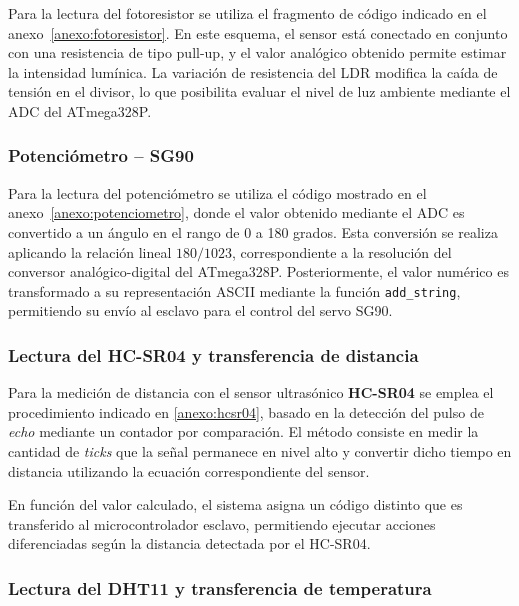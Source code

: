 Para la lectura del fotoresistor se utiliza el fragmento de código indicado en el anexo~\ref{anexo:fotoresistor}. En este esquema, el sensor está conectado en conjunto con una resistencia de tipo pull-up, y el valor analógico obtenido permite estimar la intensidad lumínica. La variación de resistencia del LDR modifica la caída de tensión en el divisor, lo que posibilita evaluar el nivel de luz ambiente mediante el ADC del ATmega328P.

\vspace{1em}
\subsubsection{\textbf{Potenciómetro – SG90}}

Para la lectura del potenciómetro se utiliza el código mostrado en el anexo~\ref{anexo:potenciometro}, donde el valor obtenido mediante el ADC es convertido a un ángulo en el rango de 0 a 180 grados. Esta conversión se realiza aplicando la relación lineal \(180/1023\), correspondiente a la resolución del conversor analógico-digital del ATmega328P. Posteriormente, el valor numérico es transformado a su representación ASCII mediante la función \texttt{add\_string}, permitiendo su envío al esclavo para el control del servo SG90.

\vspace{1em}
\subsubsection{\textbf{Lectura del HC-SR04 y transferencia de distancia}}

Para la medición de distancia con el sensor ultrasónico \textbf{HC-SR04} se emplea el procedimiento indicado en \ref{anexo:hcsr04}, basado en la detección del pulso de \textit{echo} mediante un contador por comparación. El método consiste en medir la cantidad de \textit{ticks} que la señal permanece en nivel alto y convertir dicho tiempo en distancia utilizando la ecuación correspondiente del sensor.

\vspace{1em}

En función del valor calculado, el sistema asigna un código distinto que es transferido al microcontrolador esclavo, permitiendo ejecutar acciones diferenciadas según la distancia detectada por el HC-SR04.


\vspace{1em}
\subsubsection{\textbf{Lectura del DHT11 y transferencia de temperatura}}

